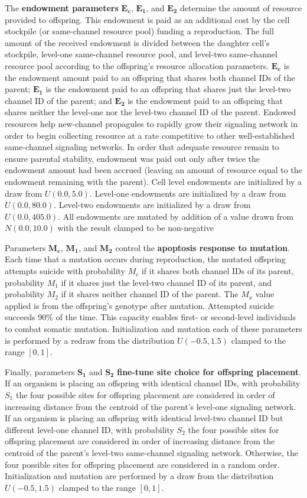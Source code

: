 {The \textbf{endowment parameters} $\bm{E_{c}}$, $\bm{E_1}$, and $\bm{E_2}$ determine the amount of resource provided to offspring.
This endowment is paid as an additional cost by the cell stockpile (or same-channel resource pool) funding a reproduction.
The full amount of the received endowment is divided between the daughter cell's stockpile, level-one same-channel resource pool, and level-two same-channel resource pool according to the offspring's resource allocation parameters.
$\bm{E_{c}}$ is the endowment amount paid to an offspring that shares both channel IDs of the parent;
$\bm{E_1}$ is the endowment paid to an offspring that shares just the level-two channel ID of the parent;
and $\bm{E_2}$ is the endowment paid to an offspring that shares neither the level-one nor the level-two channel ID of the parent.
Endowed resources help new-channel propagules to rapidly grow their signaling network in order to begin collecting resource at a rate competitive to other well-established same-channel signaling networks.
In order that adequate resource remain to ensure parental stability, endowment was paid out only after twice the endowment amount had been accrued (leaving an amount of resource equal to the endowment remaining with the parent).
Cell level endowments are initialized by a draw from $U(0.0, 5.0)$.
Level-one endowments are initialized by a draw from $U(0.0, 80.0)$.
Level-two endowments are initialized by a draw from $U(0.0,405.0)$.
All endowments are mutated by addition of a value drawn from $N(0.0,10.0)$ with the result clamped to be non-negative

Parameters $\bm{M_{c}}$, $\bm{M_1}$, and $\bm{M_2}$ control the \textbf{apoptosis response to mutation}.
Each time that a mutation occurs during reproduction, the mutated offspring attempts suicide with probability $M_{c}$ if it shares both channel IDs of its parent, probability $M_1$ if it shares just the level-two channel ID of its parent, and probability $M_2$ if it shares neither channel ID of the parent.
The $M_x$ value applied is from the offspring's genotype after mutation.
Attempted suicide succeeds 90\% of the time.
This capacity enables first- or second-level individuals to combat somatic mutation.
Initialization and mutation each of these parameters is performed by a redraw from the distribution $U(-0.5,1.5)$ clamped to the range $[0,1]$.

Finally, parameters $\bm{S_1}$ and $\bm{S_2}$ \textbf{fine-tune site choice for offspring placement}.
If an organism is placing an offspring with identical channel IDs, with probability $S_1$ the four possible sites for offspring placement are considered in order of increasing distance from the centroid of the parent's level-one signaling network.
If an organism is placing an offspring with identical level-two channel ID but different level-one channel ID, with probability $S_2$ the four possible sites for offspring placement are considered in order of increasing distance from the centroid of the parent's level-two same-channel signaling network.
Otherwise, the four possible sites for offspring placement are considered in a random order.
Initialization and mutation are performed by a draw from the distribution $U(-0.5,1.5)$ clamped to the range $[0,1]$.

}

